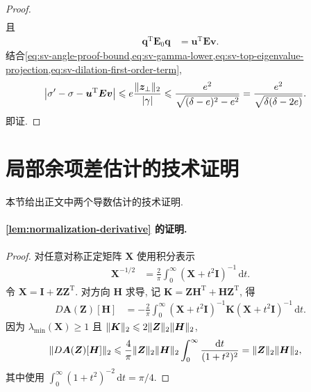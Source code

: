 \documentclass{ctexart}
\newcommand{\T}{\mathrm{T}}
\newcommand{\dt}{\delta}
\renewcommand{\ge}{\geqslant}
\renewcommand{\le}{\leqslant}
\DeclarePairedDelimiter\norm{\lVert}{\rVert}
\DeclarePairedDelimiter\abs{\lvert}{\rvert}
\begin{document}
\begin{proof}
\begin{align}
\end{align}
且
\begin{align}
    \bm q^\T\bm E_0\bm q
    &=\bm u^\T\bm E\bm v.
    \label{eq:sv-dilation-first-order-term}
\end{align}
结合\cref{eq:sv-angle-proof-bound,eq:sv-gamma-lower,eq:sv-top-eigenvalue-projection,eq:sv-dilation-first-order-term},
\begin{align}
    \abs*{\sigma'-\sigma-\bm u^\T\bm E\bm v}
    &\le e\frac{\norm{\bm z_\perp}_2}{\abs\gamma}
     \le
     \frac{e^2}{\sqrt{(\dt-e)^2-e^2}}
     =\frac{e^2}{\sqrt{\dt(\dt-2e)}}.
    \label{eq:sv-second-order-bound-proof}
\end{align}
即证.
\end{proof}

\section{局部余项差估计的技术证明}
\label{app:local-derivative-proofs}

本节给出正文中两个导数估计的技术证明.

\paragraph{\cref{lem:normalization-derivative} 的证明.}
\begin{proof}
对任意对称正定矩阵 $\bm X$ 使用积分表示
\begin{align}
    \bm X^{-1/2}
    &=\frac2\pi\int_0^\infty(\bm X+t^2\bm I)^{-1}\,\mathrm dt.
    \label{eq:inverse-sqrt-integral}
\end{align}
令 $\bm X=\bm I+\bm Z\bm Z^\T$. 对方向 $\bm H$ 求导, 记
$\bm K=\bm Z\bm H^\T+\bm H\bm Z^\T$, 得
\begin{align}
    D\bm A(\bm Z)[\bm H]
    &=-\frac2\pi\int_0^\infty
      (\bm X+t^2\bm I)^{-1}\bm K(\bm X+t^2\bm I)^{-1}\,\mathrm dt.
    \label{eq:inverse-sqrt-derivative-integral}
\end{align}
因为 $\lambda_{\min}(\bm X)\ge1$ 且
$\norm{\bm K}_2\le2\norm{\bm Z}_2\norm{\bm H}_2$,
\begin{align}
    \norm{D\bm A(\bm Z)[\bm H]}_2
    &\le\frac4\pi\norm{\bm Z}_2\norm{\bm H}_2
      \int_0^\infty\frac{\mathrm dt}{(1+t^2)^2}
     =\norm{\bm Z}_2\norm{\bm H}_2,
    \label{eq:normalization-derivative-bound-proof}
\end{align}
其中使用 $\int_0^\infty(1+t^2)^{-2}\,\mathrm dt=\pi/4$.
\end{proof}
\end{document}

